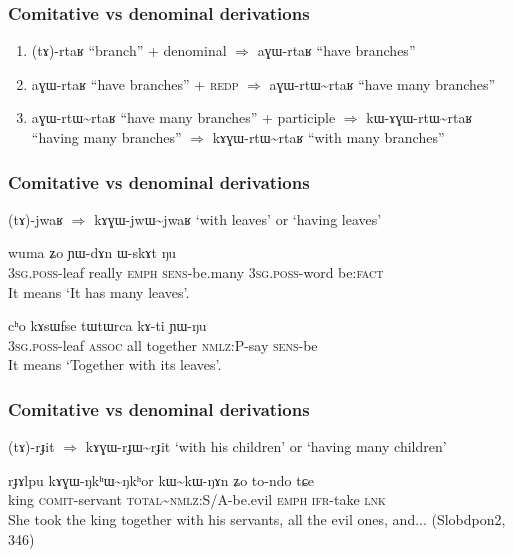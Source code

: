\documentclass[xcolor=table]{beamer}
\newcommand{\ipa}[1]{{\phon \mbox{#1}}} %
\begin{document}
 
      \begin{frame} 
\frametitle{Comitative vs denominal derivations} 
 
 \begin{enumerate}
\item \ipa{(tɤ)-rtaʁ} ``branch'' + denominal $\Rightarrow$  \ipa{aɣɯ-rtaʁ} ``have branches''
\item  \ipa{aɣɯ-rtaʁ} ``have branches'' + \textsc{redp} $\Rightarrow$  \ipa{aɣɯ-rtɯ\textasciitilde{}rtaʁ} ``have many branches'' 
\item \ipa{aɣɯ-rtɯ\textasciitilde{}rtaʁ} ``have many branches'' + participle $\Rightarrow$  \ipa{kɯ-ɤɣɯ-rtɯ\textasciitilde{}rtaʁ} ``having many branches''  $\Rightarrow$ \ipa{kɤɣɯ-rtɯ\textasciitilde{}rtaʁ} ``with many branches'' 
\end{enumerate}
 \end{frame}   
 
\begin{frame} 
\frametitle{Comitative vs denominal derivations} 
 
\ipa{(tɤ)-jwaʁ} $\Rightarrow$ \ipa{kɤɣɯ-jwɯ\textasciitilde{}jwaʁ} `with leaves' or `having leaves'
 
\begin{exe}
\ex
\gll  \ipa{ɯ-jwaʁ} 	\ipa{wuma} 	\ipa{ʑo} 	\ipa{ɲɯ-dɤn} 	\ipa{ɯ-skɤt} 	\ipa{ŋu} \\
\textsc{3sg.poss}-leaf really \textsc{emph} \textsc{sens}-be.many \textsc{3sg.poss}-word be:\textsc{fact} \\
\glt It means `It has many leaves'.
\end{exe}  

\begin{exe}
\ex
\gll \ipa{ɯ-jwaʁ} 	\ipa{cʰo} 	\ipa{kɤsɯfse} 	\ipa{tɯtɯrca} 	\ipa{kɤ-ti} 	\ipa{ɲɯ-ŋu} 
 \\
\textsc{3sg.poss}-leaf \textsc{assoc} all together \textsc{nmlz}:P-say \textsc{sens}-be  \\
\glt It means `Together with its leaves'.
\end{exe}  

 \end{frame}    

\begin{frame} 
\frametitle{Comitative vs denominal derivations} 
 
 \ipa{(tɤ)-rɟit} $\Rightarrow$ \ipa{kɤɣɯ-rɟɯ\textasciitilde{}rɟit} `with his children' or `having many children'
\begin{exe}
\ex
\gll 
\ipa{rɟɤlpu} 	\ipa{kɤɣɯ-ŋkʰɯ\textasciitilde{}ŋkʰor} 	\ipa{kɯ\textasciitilde{}kɯ-ŋɤn} 	\ipa{ʑo} 	\ipa{to-ndo} 	\ipa{tɕe} \\
king \textsc{comit}-servant \textsc{total}\textasciitilde{}\textsc{nmlz}:S/A-be.evil \textsc{emph} \textsc{ifr}-take \textsc{lnk} \\
\glt She took the king together with his servants, all the evil ones, and... (Slobdpon2, 346)
\end{exe}  
  \end{frame}    
\end{document}
